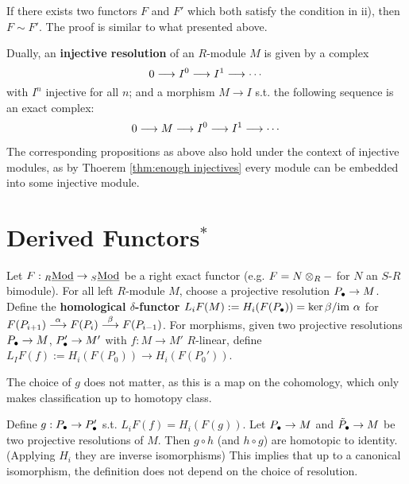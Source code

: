 \documentclass{article}
\begin{document}
\begin{remark}
    If there exists two functors $F$ and $F'$ which both satisfy the condition in ii), then $F \sim F'$. The proof is similar to what presented above.
\end{remark}

\begin{definition}
    Dually, an \textbf{injective resolution} of an $R$-module $M$ is given by a complex 
    \[
        0 \longrightarrow I^0 \longrightarrow I^1 \longrightarrow \cdots
    \]
    with $I^n$ injective for all $n$; and a morphism $M \to I$ s.t. the following sequence is an exact complex:
    \[
        0 \longrightarrow M \longrightarrow I^0 \longrightarrow I^1 \longrightarrow \cdots
    \]
\end{definition}

\begin{remark}
    The corresponding propositions as above also hold under the context of injective modules, as by Thoerem \ref{thm:enough injectives} every module can be embedded into some injective module. 
\end{remark}

\section{Derived Functors$^*$}

\begin{definition}
    Let $F: {}_{R}\underline{\textup{Mod}} \to {}_{S}\underline{\textup{Mod}}$ be a right exact functor (e.g. $F = N \otimes_R -$ for $N$ an $S$-$R$ bimodule). For all left $R$-module $M$, choose a projective resolution $P_{\bullet} \to M$. Define the \textbf{homological $\delta$-functor} ${L_iF}(M) := H_i(F(P_{\bullet})) = \ker \beta/ \mathrm{im}\  \alpha$ for $F(P_{i+1}) \overset{\alpha}{\longrightarrow} F(P_i) \overset{\beta}{\longrightarrow} F(P_{i-1})$. For morphisms, given two projective resolutions $P_{\bullet} \to M$, $P_{\bullet}' \to M'$ with $f: M \to M'$ $R$-linear, define $L_I F(f) := H_i(F(P_0)) \to H_i(F(P_0'))$.
\end{definition}

\begin{remark}
    The choice of $g$ does not matter, as this is a map on the cohomology, which only makes classification up to homotopy class.
\end{remark}

\begin{remark}
    Define $g: P_{\bullet} \to P_{\bullet}'$ s.t. $L_i F(f) = H_i(F(g))$. Let $P_{\bullet} \to M$ and $\tilde{P}_{\bullet} \to M$ be two projective resolutions of $M$. Then $g \circ h$ (and $h \circ g$) are homotopic to identity. (Applying $H_i$ they are inverse isomorphisms) This implies that up to a canonical isomorphism, the definition does not depend on the choice of resolution.
\end{remark}
\end{document}
